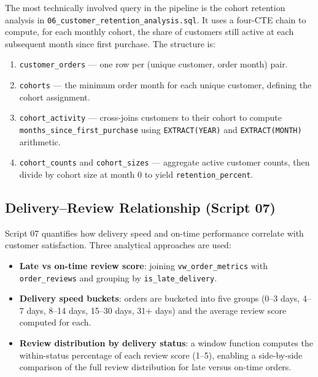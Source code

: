 \documentclass[12pt,a4paper]{article}
\begin{document}
The most technically involved query in the pipeline is the cohort retention analysis in
\texttt{06\_customer\_retention\_analysis.sql}. It uses a four-CTE chain to compute, for
each monthly cohort, the share of customers still active at each subsequent month since
first purchase. The structure is:

\begin{enumerate}
    \item \texttt{customer\_orders} — one row per (unique customer, order month) pair.
    \item \texttt{cohorts} — the minimum order month for each unique customer, defining
          the cohort assignment.
    \item \texttt{cohort\_activity} — cross-joins customers to their cohort to compute
          \texttt{months\_since\_first\_purchase} using \texttt{EXTRACT(YEAR)} and
          \texttt{EXTRACT(MONTH)} arithmetic.
    \item \texttt{cohort\_counts} and \texttt{cohort\_sizes} — aggregate active customer
          counts, then divide by cohort size at month 0 to yield
          \texttt{retention\_percent}.
\end{enumerate}

\subsection{Delivery--Review Relationship (Script 07)}

Script 07 quantifies how delivery speed and on-time performance correlate with customer
satisfaction. Three analytical approaches are used:

\begin{itemize}
    \item \textbf{Late vs on-time review score}: joining \texttt{vw\_order\_metrics} with
          \texttt{order\_reviews} and grouping by \texttt{is\_late\_delivery}.
    \item \textbf{Delivery speed buckets}: orders are bucketed into five groups
          (0--3 days, 4--7 days, 8--14 days, 15--30 days, 31+ days) and the average
          review score computed for each.
    \item \textbf{Review distribution by delivery status}: a window function computes the
          within-status percentage of each review score (1--5), enabling a side-by-side
          comparison of the full review distribution for late versus on-time orders.
\end{itemize}
\end{document}
